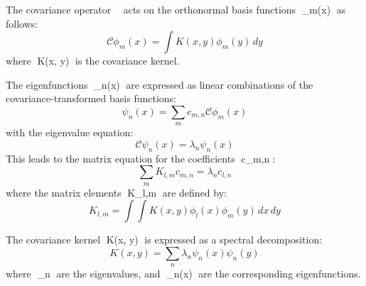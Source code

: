 \documentclass{article}
\begin{document}
The covariance operator  acts on the orthonormal basis functions \phi_m(x) as follows:
\[
\mathcal{C} \phi_m(x) = \int K(x, y) \phi_m(y) \, dy
\]
where K(x, y) is the covariance kernel.

The eigenfunctions \psi_n(x) are expressed as linear combinations of the covariance-transformed basis functions:
\[
\psi_n(x) = \sum_m c_{m,n} \mathcal{C} \phi_m(x)
\]
with the eigenvalue equation:
\[
\mathcal{C} \psi_n(x) = \lambda_n \psi_n(x)
\]
This leads to the matrix equation for the coefficients c_{m,n}:
\[
\sum_m K_{l,m} c_{m,n} = \lambda_n c_{l,n}
\]
where the matrix elements K_{l,m} are defined by:
\[
K_{l,m} = \int \int K(x, y) \phi_l(x) \phi_m(y) \, dx \, dy
\]

The covariance kernel K(x, y) is expressed as a spectral decomposition:
\[
K(x, y) = \sum_n \lambda_n \psi_n(x) \psi_n(y)
\]
where \lambda_n are the eigenvalues, and \psi_n(x) are the corresponding eigenfunctions.
\end{document}
